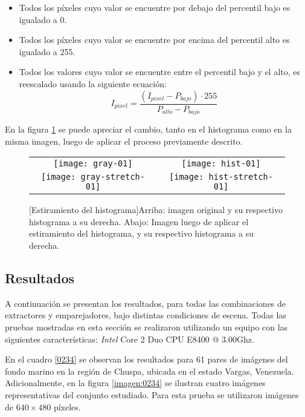 \begin{itemize}
	\item Todos los píxeles cuyo valor se encuentre por debajo del percentil bajo es igualado a 0.
	\item Todos los píxeles cuyo valor se encuentre por encima del percentil alto es igualado a 255.
	\item Todos los valores cuyo valor se encuentre entre el percentil bajo y el alto, es reescalado usando la siguiente ecuación: 
	\begin{displaymath}
		I_{pixel} = \frac{(I_{pixel} - P_{bajo}) \cdot 255}{P_{alto} - P_{bajo}}
	\end{displaymath}
\end{itemize}

En la figura \ref{imagen:stretch} se puede apreciar el cambio, tanto en el histograma como en la misma imagen, luego de aplicar el proceso previamente descrito.


\begin{figure}[h]
	\centering
	\vspace{0.6cm}
	\begin{tabular}{@{}cc@{}}
		\texttt{[image: gray-01]} &
		\texttt{[image: hist-01]} \\
		\texttt{[image: gray-stretch-01]} &
		\texttt{[image: hist-stretch-01]}
	\end{tabular}
	[Estiramiento del histograma]{Arriba: imagen original y su respectivo histograma a su derecha. Abajo: Imagen luego de aplicar el estiramiento del histograma, y su respectivo histograma a su derecha.}
	\label{imagen:stretch}
\end{figure}


\subsection{Resultados}

A continuación se presentan los resultados, para todas las combinaciones de extractores y emparejadores, bajo distintas condiciones de escena. Todas las pruebas mostradas en esta sección se realizaron utilizando un equipo con las siguientes características:  \textit{Intel\textsuperscript \textregistered } Core 2 Duo CPU E8400 @ 3.00Ghz.

En el cuadro \ref{0234} se observan los resultados para 61 pares de imágenes del fondo marino en la región de Chuspa, ubicada en el estado Vargas, Venezuela. Adicionalmente, en la figura \ref{imagen:0234} se ilustran cuatro imágenes representativas del conjunto estudiado. Para esta prueba se utilizaron imágenes de $640\times480$ píxeles.

